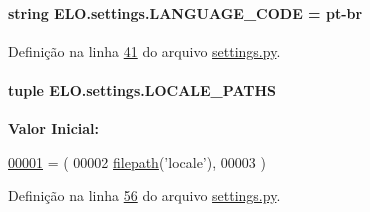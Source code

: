 \paragraph[{L\+A\+N\+G\+U\+A\+G\+E\+\_\+\+C\+O\+D\+E}]{\setlength{\rightskip}{0pt plus 5cm}string E\+L\+O.\+settings.\+L\+A\+N\+G\+U\+A\+G\+E\+\_\+\+C\+O\+D\+E = \textquotesingle{}pt-\/br\textquotesingle{}}\label{namespaceELO_1_1settings_a388841a63bae5418e55fb741f938d4fb}


Definição na linha \hyperlink{settings_8py_source_l00041}{41} do arquivo \hyperlink{settings_8py_source}{settings.\+py}.

\hypertarget{namespaceELO_1_1settings_a977570dd2e9cd8142b3d65c4fa37c172}{}
\paragraph[{L\+O\+C\+A\+L\+E\+\_\+\+P\+A\+T\+H\+S}]{\setlength{\rightskip}{0pt plus 5cm}tuple E\+L\+O.\+settings.\+L\+O\+C\+A\+L\+E\+\_\+\+P\+A\+T\+H\+S}\label{namespaceELO_1_1settings_a977570dd2e9cd8142b3d65c4fa37c172}
{\bfseries Valor Inicial\+:}
\begin{DoxyCode}
\hypertarget{namespaceELO_1_1settings_l00001}{}\hyperlink{namespaceELO_1_1settings}{00001} = (
00002     \hyperlink{namespaceELO_1_1settings_a7730264ddd478343e0f282f36d4a5ab4}{filepath}(\textcolor{stringliteral}{'locale'}),
00003 )
\end{DoxyCode}


Definição na linha \hyperlink{settings_8py_source_l00056}{56} do arquivo \hyperlink{settings_8py_source}{settings.\+py}.

\hypertarget{namespaceELO_1_1settings_addc421e02af1569796e2d33b2bc62ff5}{}
